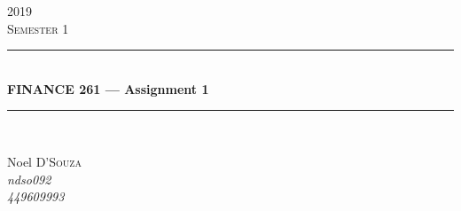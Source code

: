 \documentclass[12pt]{article}
\begin{document}
\begin{titlepage} %
	\newcommand{\HRule}{\rule{\linewidth}{0.5mm}} %
	\center %
	
    
	\textsc{\LARGE 2019}\\[1.5cm] %
	\textsc{\Large Semester 1}\\[0.5cm] %
	
	
	\HRule\\[0.4cm]
	{\huge\bfseries FINANCE 261 --- Assignment 1}\\[0.4cm] %
	\HRule\\[1cm]
	
	
    \begin{minipage}[t]{0.4\textwidth}
        \vspace{0pt}
		\begin{center}
			\large
			Noel \textsc{D'Souza}\\ %
			\textit{ndso092}\\
			\textit{449609993}
		\end{center}
	\end{minipage}
	~


\end{titlepage}
\end{document}
